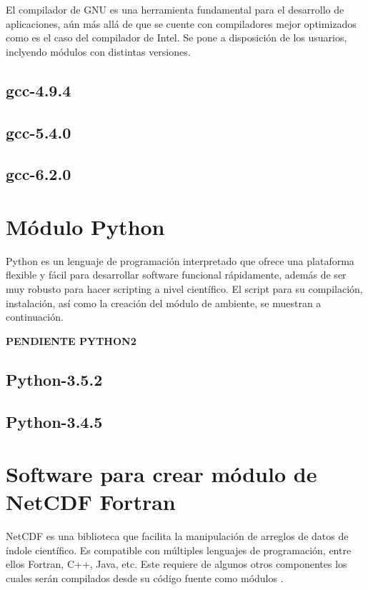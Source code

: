 El compilador de GNU es una herramienta fundamental para el desarrollo de aplicaciones, aún más allá de que se cuente con compiladores mejor optimizados como es el caso del compilador de Intel. Se pone a disposición de los usuarios, inclyendo módulos con distintas versiones.
\subsection{gcc-4.9.4}



\subsection{gcc-5.4.0}



\subsection{gcc-6.2.0}




\section{Módulo Python}
Python es un lenguaje  de programación interpretado que ofrece una plataforma flexible y fácil para desarrollar software funcional rápidamente, además de ser muy robusto para hacer scripting a nivel científico. El script para su compilación, instalación, así como la creación del módulo de ambiente, se muestran a continuación.

\textbf{\huge{PENDIENTE PYTHON2}}

\subsection{Python-3.5.2}



\subsection{Python-3.4.5}



\section{Software para crear módulo de NetCDF Fortran}
NetCDF es una biblioteca que facilita la manipulación de arreglos de datos de índole científico. Es compatible con múltiples lenguajes de programación, entre ellos Fortran, C++, Java, etc. Este requiere de algunos otros componentes los cuales serán compilados desde su código fuente como módulos \cite{netcdf}.

